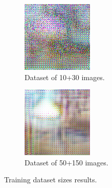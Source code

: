 \documentclass[twocolumn,superscriptaddress,aps,floatfix, nofootinbib]{revtex4-1}
\begin{document}
    \begin{figure}[ht!]
        \centering
        \begin{subfigure}[b]{0.22\textwidth}
            \centering
            \includegraphics[width=\textwidth]{resources/png/gan-results/inc1030.png}
            \caption{Dataset of 10+30 images.}
        \end{subfigure}
        \hfill
        \begin{subfigure}[b]{0.22\textwidth}
            \centering
            \includegraphics[width=\textwidth]{resources/png/gan-results/inc50150.png}
            \caption{Dataset of 50+150 images.}
            \label{fig:trainingsizes}
        \end{subfigure}
        \caption{Training dataset sizes results.}
    \end{figure}
    
\end{document}
